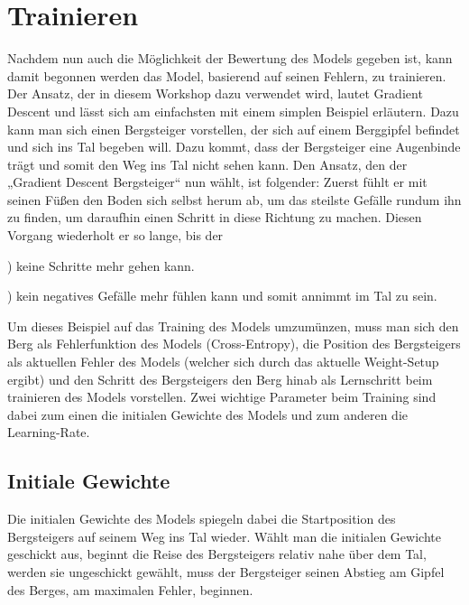 \chapter{Trainieren}

Nachdem nun auch die Möglichkeit der Bewertung des Models gegeben ist, kann damit begonnen werden das Model, basierend auf seinen Fehlern, zu trainieren. Der Ansatz, der in diesem Workshop dazu verwendet wird, lautet Gradient Descent und lässt sich am einfachsten mit einem simplen Beispiel erläutern. Dazu kann man sich einen Bergsteiger vorstellen, der sich auf einem Berggipfel befindet und sich ins Tal begeben will. Dazu kommt, dass der Bergsteiger eine Augenbinde trägt und somit den Weg ins Tal nicht sehen kann. Den Ansatz, den der „Gradient Descent Bergsteiger“ nun wählt, ist folgender:
Zuerst fühlt er mit seinen Füßen den Boden sich selbst herum ab, um das steilste Gefälle rundum ihn zu finden, um daraufhin einen Schritt in diese Richtung zu machen.
Diesen Vorgang wiederholt er so lange, bis der 
   \begin{list} 
       \setcounter{zaehler}{1} 
      \item[\alph{zaehler})] keine Schritte mehr gehen kann. 
      \item[\alph{zaehler})] kein negatives Gefälle mehr fühlen kann und somit annimmt im Tal zu sein.
   \end{list} 


Um dieses Beispiel auf das Training des Models umzumünzen, muss man sich den Berg als Fehlerfunktion des Models (Cross-Entropy), die Position des Bergsteigers als aktuellen Fehler des Models (welcher sich durch das aktuelle Weight-Setup ergibt) und den Schritt des Bergsteigers den Berg hinab als Lernschritt beim trainieren des Models vorstellen. Zwei wichtige Parameter beim Training sind dabei zum einen die initialen Gewichte des Models und zum anderen die Learning-Rate.


\section{Initiale Gewichte}
Die initialen Gewichte des Models spiegeln dabei die Startposition des Bergsteigers auf seinem Weg ins Tal wieder. Wählt man die initialen Gewichte geschickt aus, beginnt die Reise des Bergsteigers relativ nahe über dem Tal, werden sie ungeschickt gewählt, muss der Bergsteiger seinen Abstieg am Gipfel des Berges, am maximalen Fehler, beginnen. 



